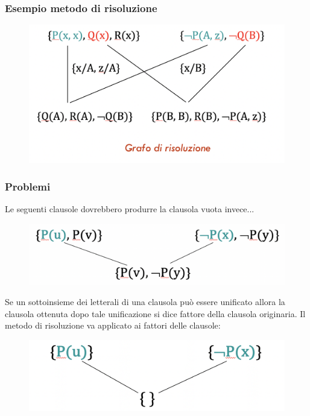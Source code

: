 \documentclass{article}
\begin{document}
\subsubsection{Esempio metodo di risoluzione}
\begin{figure}[H]
\centering
\includegraphics[scale=0.35]{Images/FOLresexample.png}
\end{figure}

\subsubsection{Problemi}
Le seguenti clausole dovrebbero produrre la clausola vuota invece...
\begin{figure}[H]
\centering
\includegraphics[scale=0.4]{Images/problem_a.png}
\end{figure}
Se un sottoinsieme dei letterali di una clausola può essere unificato allora la clausola ottenuta dopo tale unificazione si dice fattore della clausola originaria.\newline
Il metodo di risoluzione va applicato ai fattori delle clausole:
\begin{figure}[H]
\centering
\includegraphics[scale=0.4]{Images/problem_b.png}
\end{figure}
\end{document}
